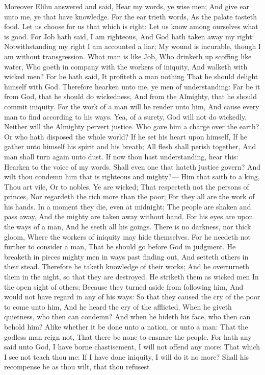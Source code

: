Moreover Elihu answered and said,  Hear my words, ye wise men; And give ear unto me, ye that have knowledge.  For the ear trieth words, As the palate tasteth food.  Let us choose for us that which is right: Let us know among ourselves what is good.  For Job hath said, I am righteous, And God hath taken away my right:  Notwithstanding my right I am accounted a liar; My wound is incurable, though I am without transgression.  What man is like Job, Who drinketh up scoffing like water,  Who goeth in company with the workers of iniquity, And walketh with wicked men?  For he hath said, It profiteth a man nothing That he should delight himself with God.  Therefore hearken unto me, ye men of understanding: Far be it from God, that he should do wickedness, And from the Almighty, that he should commit iniquity.  For the work of a man will he render unto him, And cause every man to find according to his ways.  Yea, of a surety, God will not do wickedly, Neither will the Almighty pervert justice.  Who gave him a charge over the earth? Or who hath disposed the whole world?  If he set his heart upon himself, If he gather unto himself his spirit and his breath;  All flesh shall perish together, And man shall turn again unto dust.  If now thou hast understanding, hear this: Hearken to the voice of my words.  Shall even one that hateth justice govern? And wilt thou condemn him that is righteous and mighty?—  Him that saith to a king, Thou art vile, Or to nobles, Ye are wicked;  That respecteth not the persons of princes, Nor regardeth the rich more than the poor; For they all are the work of his hands.  In a moment they die, even at midnight; The people are shaken and pass away, And the mighty are taken away without hand.  For his eyes are upon the ways of a man, And he seeth all his goings.  There is no darkness, nor thick gloom, Where the workers of iniquity may hide themselves.  For he needeth not further to consider a man, That he should go before God in judgment.  He breaketh in pieces mighty men in ways past finding out, And setteth others in their stead.  Therefore he taketh knowledge of their works; And he overturneth them in the night, so that they are destroyed.  He striketh them as wicked men In the open sight of others;  Because they turned aside from following him, And would not have regard in any of his ways:  So that they caused the cry of the poor to come unto him, And he heard the cry of the afflicted.  When he giveth quietness, who then can condemn? And when he hideth his face, who then can behold him? Alike whether it be done unto a nation, or unto a man:  That the godless man reign not, That there be none to ensnare the people.  For hath any said unto God, I have borne chastisement, I will not offend any more:  That which I see not teach thou me: If I have done iniquity, I will do it no more?  Shall his recompense be as thou wilt, that thou refusest 